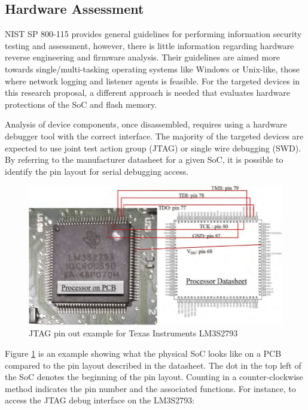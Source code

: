 \subsection{Hardware Assessment} \label{hardwareassessment}

NIST SP 800-115 \autocite{NISTSP8001152020} provides general guidelines for performing information security testing and assessment, however, there is little information regarding hardware reverse engineering and firmware analysis. Their guidelines are aimed more towards single/multi-tasking operating systems like Windows or Unix-like, those where network logging and listener agents is feasible. For the targeted devices in this research proposal, a different approach is needed that evaluates hardware protections of the SoC and flash memory. 

Analysis of device components, once disassembled, requires using a hardware debugger tool with the correct interface. The majority of the targeted devices are expected to use joint test action group (JTAG) or single wire debugging (SWD). By referring to the manufacturer datasheet for a given SoC, it is possible to identify the pin layout for serial debugging access.

\begin{figure}[ht]%
  \centering
  \includegraphics[keepaspectratio]{Figures/JTAGExample.png}
  \caption{JTAG pin out example for Texas Instruments LM3S2793}%
  \label{fig:jtag_pinout}%
\end{figure}

Figure \ref{fig:jtag_pinout} is an example showing what the physical SoC looks like on a PCB compared to the pin layout described in the datasheet. The dot in the top left of the SoC denotes the beginning of the pin layout. Counting in a counter-clockwise method indicates the pin number and the associated functions. For instance, to access the JTAG debug interface on the LM3S2793:

